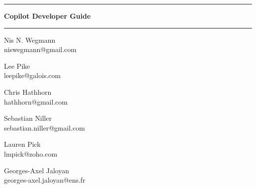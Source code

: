 \documentclass[12pt]{article}
\theoremstyle{example}
\newcommand{\HRule}{\rule{\linewidth}{0.25pt}}
\begin{document}
\vspace{0.1cm}

\HRule

\vspace{0.6cm}

{\Huge \bfseries
Copilot Developer Guide
}


\HRule

\vspace{0.6cm}

\begin{minipage}{0.4\textwidth}
\large
\begin{center}
Nis N. Wegmann\\
\small{
niswegmann@gmail.com\\
}

\end{center}
\end{minipage}
\begin{minipage}{0.4\textwidth}
\large
\begin{center}
Lee Pike\\
\small{
leepike@galois.com\\
}
\end{center}
\end{minipage}
\vspace{1cm}



\begin{minipage}{0.3\textwidth}
\large
\begin{center}
Chris Hathhorn \\
\small{
hathhorn@gmail.com\\
}
\end{center}
\end{minipage}
\begin{minipage}{0.3\textwidth}
\large
\begin{center}
Sebastian Niller\\
\small{
sebastian.niller@gmail.com\\
}
\end{center}
\end{minipage}

\vspace{1cm}

\begin{minipage}{0.3\textwidth}
\large
\begin{center}
Lauren Pick\\
\small{
lmpick@zoho.com\\
}
\end{center}
\end{minipage}
\begin{minipage}{0.3\textwidth}
\large
\begin{center}
Georges-Axel Jaloyan \\
\small{
georges-axel.jaloyan@ens.fr\\
}
\end{center}
\end{minipage}
\end{document}
